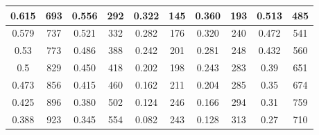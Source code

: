 \begin{table}[H]
{\begin{tabular}{|cc|cc|cc|cc|cc|}
		\multicolumn{1}{|c|}{0.615}          & 693                                & \multicolumn{1}{c|}{0.556}          & 292                               & \multicolumn{1}{c|}{0.322}           & 145                   & \multicolumn{1}{c|}{0.360}      & 193                   & \multicolumn{1}{c|}{0.513}      & 485                   \\ \hline
		\multicolumn{1}{|c|}{0.579}          & 737                                & \multicolumn{1}{c|}{0.521}          & 332                               & \multicolumn{1}{c|}{0.282}           & 176                   & \multicolumn{1}{c|}{0.320}      & 240                   & \multicolumn{1}{c|}{0.472}      & 541                   \\ \hline
		\multicolumn{1}{|c|}{0.53}           & 773                                & \multicolumn{1}{c|}{0.486}          & 388                               & \multicolumn{1}{c|}{0.242}           & 201                   & \multicolumn{1}{c|}{0.281}      & 248                   & \multicolumn{1}{c|}{0.432}      & 560                   \\ \hline
		\multicolumn{1}{|c|}{0.5}            & 829                                & \multicolumn{1}{c|}{0.450}          & 418                               & \multicolumn{1}{c|}{0.202}           & 198                   & \multicolumn{1}{c|}{0.243}      & 283                   & \multicolumn{1}{c|}{0.39}       & 651                   \\ \hline
		\multicolumn{1}{|c|}{0.473}          & 856                                & \multicolumn{1}{c|}{0.415}          & 460                               & \multicolumn{1}{c|}{0.162}           & 211                   & \multicolumn{1}{c|}{0.204}      & 285                   & \multicolumn{1}{c|}{0.35}       & 674                   \\ \hline
		\multicolumn{1}{|c|}{0.425}          & 896                                & \multicolumn{1}{c|}{0.380}          & 502                               & \multicolumn{1}{c|}{0.124}           & 246                   & \multicolumn{1}{c|}{0.166}      & 294                   & \multicolumn{1}{c|}{0.31}       & 759                   \\ \hline
		\multicolumn{1}{|c|}{0.388}          & 923                                & \multicolumn{1}{c|}{0.345}          & 554                               & \multicolumn{1}{c|}{0.082}           & 243                   & \multicolumn{1}{c|}{0.128}      & 313                   & \multicolumn{1}{c|}{0.27}       & 710                   \\ \hline

\end{tabular}}
\end{table}
